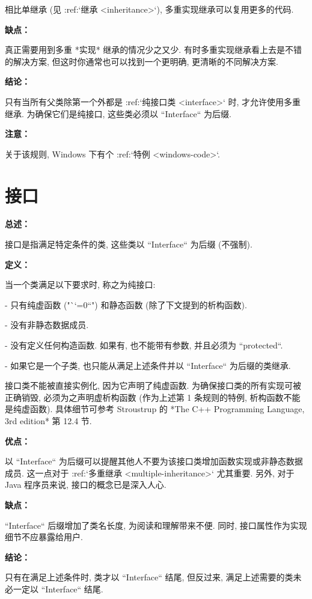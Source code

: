 相比单继承 (见 :ref:`继承 <inheritance>`), 多重实现继承可以复用更多的代码.

\textbf{缺点：}

真正需要用到多重 *实现* 继承的情况少之又少. 有时多重实现继承看上去是不错的解决方案, 但这时你通常也可以找到一个更明确, 更清晰的不同解决方案.

\textbf{结论：}

只有当所有父类除第一个外都是 :ref:`纯接口类 <interface>` 时, 才允许使用多重继承. 为确保它们是纯接口, 这些类必须以 ``Interface`` 为后缀.

\textbf{注意：}

关于该规则, Windows 下有个 :ref:`特例 <windows-code>`.

\section{接口} \label{interface}

\textbf{总述：}

接口是指满足特定条件的类, 这些类以 ``Interface`` 为后缀 (不强制).

\textbf{定义：}

当一个类满足以下要求时, 称之为纯接口:

- 只有纯虚函数 ("``=0``") 和静态函数 (除了下文提到的析构函数).

- 没有非静态数据成员.

- 没有定义任何构造函数. 如果有, 也不能带有参数, 并且必须为 ``protected``.

- 如果它是一个子类, 也只能从满足上述条件并以 ``Interface`` 为后缀的类继承.

接口类不能被直接实例化, 因为它声明了纯虚函数. 为确保接口类的所有实现可被正确销毁, 必须为之声明虚析构函数 (作为上述第 1 条规则的特例, 析构函数不能是纯虚函数). 具体细节可参考 Stroustrup 的 *The C++ Programming Language, 3rd edition* 第 12.4 节.

\textbf{优点：}

以 ``Interface`` 为后缀可以提醒其他人不要为该接口类增加函数实现或非静态数据成员. 这一点对于 :ref:`多重继承 <multiple-inheritance>` 尤其重要. 另外, 对于 Java 程序员来说, 接口的概念已是深入人心.

\textbf{缺点：}

``Interface`` 后缀增加了类名长度, 为阅读和理解带来不便. 同时, 接口属性作为实现细节不应暴露给用户.

\textbf{结论：}

只有在满足上述条件时, 类才以 ``Interface`` 结尾, 但反过来, 满足上述需要的类未必一定以 ``Interface`` 结尾.

